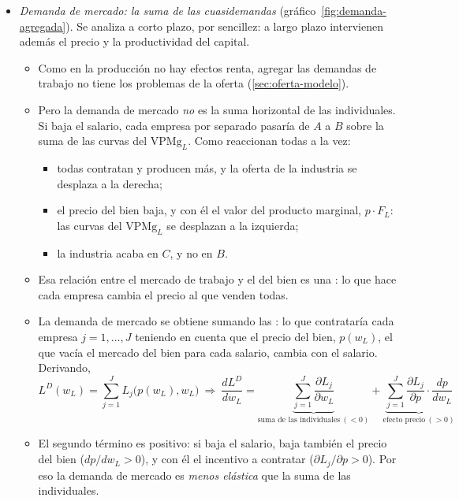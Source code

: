 \documentclass[11pt]{article}
\begin{document}
\begin{itemize}
\item \emph{Demanda de mercado: la suma de las cuasidemandas} (gráfico~\ref{fig:demanda-agregada}). Se analiza a corto plazo, por sencillez: a largo plazo intervienen además el precio y la productividad del capital.
  \begin{itemize}
  \item Como en la producción no hay efectos renta, agregar las demandas de trabajo no tiene los problemas de la oferta (\ref{sec:oferta-modelo}).
  \item Pero la demanda de mercado \emph{no} es la suma horizontal de las individuales. Si baja el salario, cada empresa por separado pasaría de $A$ a $B$ sobre la suma de las curvas del $\mathrm{VPMg}_L$. Como reaccionan todas a la vez:
    \begin{itemize}
    \item todas contratan y producen más, y la oferta de la industria se desplaza a la derecha;
    \item el precio del bien baja, y con él el valor del producto marginal, $p\cdot F_L$: las curvas del $\mathrm{VPMg}_L$ se desplazan a la izquierda;
    \item la industria acaba en $C$, y no en $B$.
    \end{itemize}
  \item Esa relación entre el mercado de trabajo y el del bien es una : lo que hace cada empresa cambia el precio al que venden todas.
  \item La demanda de mercado se obtiene sumando las : lo que contrataría cada empresa $j=1,\dots,J$ teniendo en cuenta que el precio del bien, $p(w_L)$, el que vacía el mercado del bien para cada salario, cambia con el salario. Derivando,
    \begin{equation}
    L^D(w_L)=\sum_{j=1}^{J}L_j\big(p(w_L),w_L\big)\ \Longrightarrow\ \frac{dL^D}{dw_L}=\underbrace{\sum_{j=1}^{J}\frac{\partial L_j}{\partial w_L}}_{\text{suma de las individuales}\ (<0)}+\underbrace{\sum_{j=1}^{J}\frac{\partial L_j}{\partial p}\cdot\frac{dp}{dw_L}}_{\text{efecto precio}\ (>0)}\label{eq:cuasidemandas}
    \end{equation}
  \item El segundo término es positivo: si baja el salario, baja también el precio del bien ($dp/dw_L>0$), y con él el incentivo a contratar ($\partial L_j/\partial p>0$). Por eso la demanda de mercado es \emph{menos elástica} que la suma de las individuales.
  \end{itemize}
\end{itemize}
\end{document}
